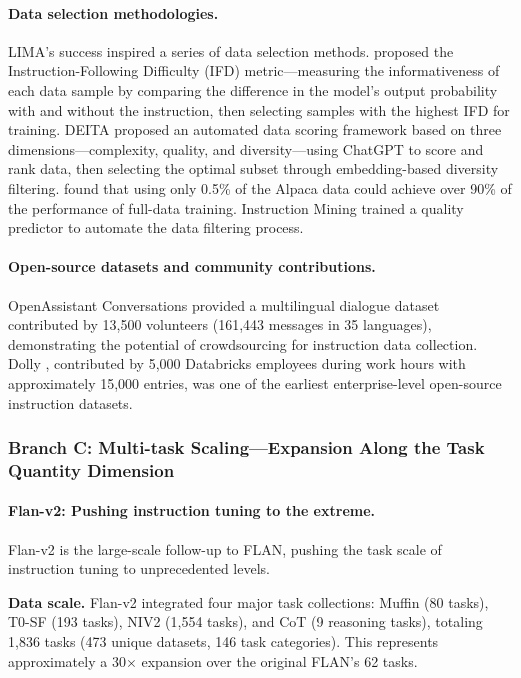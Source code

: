 \paragraph{Data selection methodologies.}
LIMA's success inspired a series of data selection methods.
\citet{li2023ifd} proposed the Instruction-Following Difficulty (IFD) metric---measuring
the informativeness of each data sample by comparing the difference in the model's output probability with and without the instruction,
then selecting samples with the highest IFD for training.
DEITA \citep{liu2024deita} proposed an automated data scoring framework based on three dimensions---complexity, quality, and diversity---using ChatGPT to score and rank data,
then selecting the optimal subset through embedding-based diversity filtering.
\citet{chen2023maybeonly} found that using only 0.5\% of the Alpaca data could achieve over 90\% of the performance of full-data training.
Instruction Mining \citep{cao2023instructionmining} trained a quality predictor
to automate the data filtering process.

\paragraph{Open-source datasets and community contributions.}
OpenAssistant Conversations \citep{kopf2023openassistant} provided
a multilingual dialogue dataset contributed by 13,500 volunteers (161,443 messages in 35 languages),
demonstrating the potential of crowdsourcing for instruction data collection.
Dolly \citep{conover2023dolly}, contributed by 5,000 Databricks employees during work hours with approximately 15,000 entries,
was one of the earliest enterprise-level open-source instruction datasets.


\subsubsection{Branch C: Multi-task Scaling---Expansion Along the Task Quantity Dimension}
\label{sec:t1-multitask}

\paragraph{Flan-v2: Pushing instruction tuning to the extreme.}
Flan-v2 is the large-scale follow-up to FLAN,
pushing the task scale of instruction tuning to unprecedented levels.

\textbf{Data scale.}
Flan-v2 integrated four major task collections:
Muffin (80 tasks), T0-SF (193 tasks), NIV2 (1,554 tasks), and CoT (9 reasoning tasks),
totaling 1,836 tasks (473 unique datasets, 146 task categories).
This represents approximately a 30$\times$ expansion over the original FLAN's 62 tasks.

